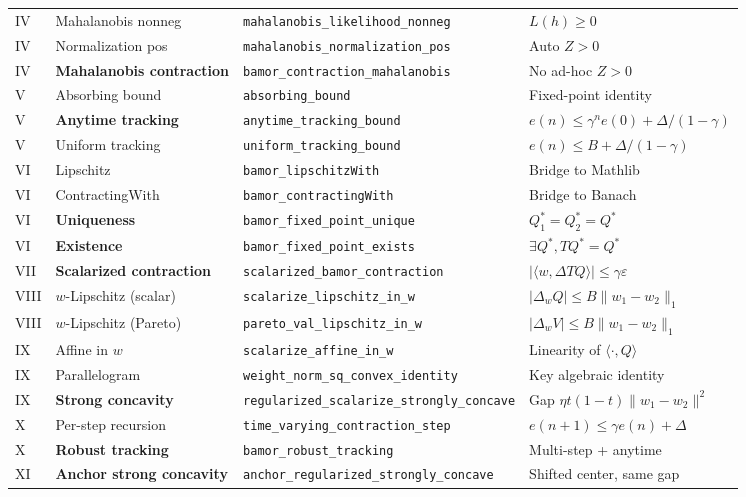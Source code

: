 \begin{longtable}{@{}p{}p{}p{}p{}@{}}
IV & Mahalanobis nonneg & \texttt{mahalanobis\_likelihood\_nonneg} & $L(h) \ge 0$ \\
IV & Normalization pos & \texttt{mahalanobis\_normalization\_pos} & Auto $Z > 0$ \\
IV & \textbf{Mahalanobis contraction} & \texttt{bamor\_contraction\_mahalanobis} & No ad-hoc $Z > 0$ \\
\midrule
V & Absorbing bound & \texttt{absorbing\_bound} & Fixed-point identity \\
V & \textbf{Anytime tracking} & \texttt{anytime\_tracking\_bound} & $e(n) \le \gamma^n e(0) + \Delta/(1{-}\gamma)$ \\
V & Uniform tracking & \texttt{uniform\_tracking\_bound} & $e(n) \le B + \Delta/(1{-}\gamma)$ \\
\midrule
VI & Lipschitz & \texttt{bamor\_lipschitzWith} & Bridge to Mathlib \\
VI & ContractingWith & \texttt{bamor\_contractingWith} & Bridge to Banach \\
VI & \textbf{Uniqueness} & \texttt{bamor\_fixed\_point\_unique} & $Q_1^* = Q_2^* = Q^*$ \\
VI & \textbf{Existence} & \texttt{bamor\_fixed\_point\_exists} & $\exists Q^*, TQ^* = Q^*$ \\
\midrule
VII & \textbf{Scalarized contraction} & \texttt{scalarized\_bamor\_contraction} & $|\langle w, \Delta TQ \rangle| \le \gamma\varepsilon$ \\
\midrule
VIII & $w$-Lipschitz (scalar) & \texttt{scalarize\_lipschitz\_in\_w} & $|\Delta_w Q| \le B\|w_1{-}w_2\|_1$ \\
VIII & $w$-Lipschitz (Pareto) & \texttt{pareto\_val\_lipschitz\_in\_w} & $|\Delta_w V| \le B\|w_1{-}w_2\|_1$ \\
\midrule
IX & Affine in $w$ & \texttt{scalarize\_affine\_in\_w} & Linearity of $\langle \cdot, Q \rangle$ \\
IX & Parallelogram & \texttt{weight\_norm\_sq\_convex\_identity} & Key algebraic identity \\
IX & \textbf{Strong concavity} & \texttt{regularized\_scalarize\_strongly\_concave} & Gap $\eta t(1{-}t)\|w_1{-}w_2\|^2$ \\
\midrule
X & Per-step recursion & \texttt{time\_varying\_contraction\_step} & $e(n{+}1) \le \gamma e(n) + \Delta$ \\
X & \textbf{Robust tracking} & \texttt{bamor\_robust\_tracking} & Multi-step + anytime \\
\midrule
XI & \textbf{Anchor strong concavity} & \texttt{anchor\_regularized\_strongly\_concave} & Shifted center, same gap \\

\end{longtable}
